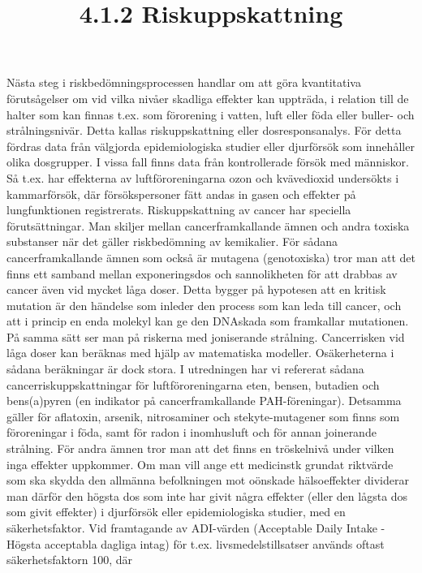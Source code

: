 \title{
4.1.2 Riskuppskattning
}
Nästa steg i riskbedömningsprocessen handlar om att göra kvantitativa förutsågelser om vid vilka nivåer skadliga effekter kan uppträda, i relation till de halter som kan finnas t.ex. som förorening i vatten, luft eller föda eller buller- och strålningsnivär. Detta kallas riskuppskattning eller dosresponsanalys. För detta fördras data från välgjorda epidemiologiska studier eller djurförsök som innehåller olika dosgrupper. I vissa fall finns data från kontrollerade försök med människor. Så t.ex. har effekterna av luftföroreningarna ozon och kvävedioxid undersökts i kammarförsök, där försökspersoner fätt andas in gasen och effekter på lungfunktionen registrerats.
Riskuppskattning av cancer har speciella förutsättningar. Man skiljer mellan cancerframkallande ämnen och andra toxiska substanser när det gäller riskbedömning av kemikalier. För sådana cancerframkallande ämnen som också är mutagena (genotoxiska) tror man att det finns ett samband mellan exponeringsdos och sannolikheten för att drabbas av cancer även vid mycket låga doser. Detta bygger på hypotesen att en kritisk mutation är den händelse som inleder den process som kan leda till cancer, och att i princip en enda molekyl kan ge den DNAskada som framkallar mutationen. På samma sätt ser man på riskerna med joniserande strålning. Cancerrisken vid låga doser kan beräknas med hjälp av matematiska modeller. Osäkerheterna i sådana beräkningar är dock stora. I utredningen har vi refererat sådana cancerriskuppskattningar för luftföroreningarna eten, bensen, butadien och bens(a)pyren (en indikator på cancerframkallande PAH-föreningar). Detsamma gäller för aflatoxin, arsenik, nitrosaminer och stekyte-mutagener som finns som föroreningar i föda, samt för radon i inomhusluft och för annan joinerande strålning.
För andra ämnen tror man att det finns en tröskelnivå under vilken inga effekter uppkommer. Om man vill ange ett medicinstk grundat riktvärde som ska skydda den allmänna befolkningen mot oönskade hälsoeffekter dividerar man därför den högsta dos som inte har givit några effekter (eller den lågsta dos som givit effekter) i djurförsök eller epidemiologiska studier, med en säkerhetsfaktor. Vid framtagande av ADI-värden (Acceptable Daily Intake - Högsta acceptabla dagliga intag) för t.ex. livsmedelstillsatser används oftast säkerhetsfaktorn 100, där

